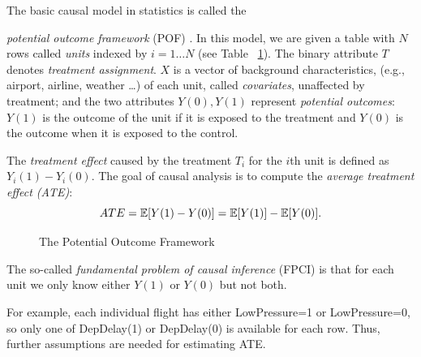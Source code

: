{The basic causal model in statistics is called the
{\em potential outcome framework} (POF) \cite{Rubin2005}.
In this model, we are given a table with $N$ rows called {\em units} indexed by $i=1 \ldots N$ (see
Table~ \ref{fig:causal:inference}).  The binary attribute $T$ denotes {\em treatment assignment}.
$X$ is a vector of
background characteristics, (e.g., airport, airline, weather \ldots) of each unit,
called {\em covariates}, unaffected by treatment; and the two
attributes $Y(0), Y(1)$ represent {\em potential outcomes}: $Y(1)$ is
the outcome of the unit if it is exposed to the treatment and $Y(0)$
is the outcome when it is exposed to the control.

The {\em treatment effect}
caused by the treatment $T_i$ for the $i$th unit  is defined as $Y_i(1)-Y_i(0)$.
The goal of causal analysis is to compute the {\em average treatment
  effect (ATE)}:   $$ATE = \mathbb{E}[Y(1)-Y(0)] = \mathbb{E}[Y(1)] - \mathbb{E}[Y(0)].$$


\begin{figure}
  \centering
{\scriptsize
}
\caption{The Potential Outcome Framework}
  \label{fig:causal:inference}
  \vspace{-3mm}
\end{figure}
\noindent
The so-called {\em fundamental problem of causal inference} (FPCI) is that
for each unit we only know either $Y(1)$ or $Y(0)$ but not both.
 For example, each individual
flight has either LowPressure=1 or LowPressure=0, so only one of DepDelay(1)
or DepDelay(0) is available for each row.
Thus, further assumptions are needed for estimating ATE. 

}
